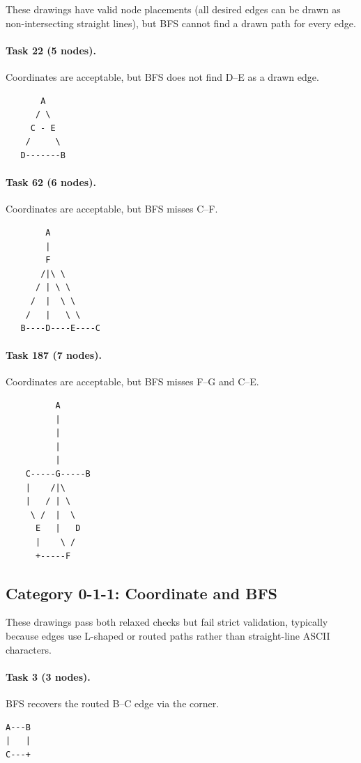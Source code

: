 \documentclass{article}
\begin{document}
These drawings have valid node placements (all desired edges can be drawn as non-intersecting straight lines), but BFS cannot find a drawn path for every edge.

\paragraph{Task 22 (5 nodes).} Coordinates are acceptable, but BFS does not find D--E as a drawn edge.

\begin{verbatim}
       A
      / \
     C - E
    /     \
   D-------B
\end{verbatim}

\paragraph{Task 62 (6 nodes).} Coordinates are acceptable, but BFS misses C--F.

\begin{verbatim}
        A
        |
        F
       /|\ \
      / | \ \
     /  |  \ \
    /   |   \ \
   B----D----E----C
\end{verbatim}

\paragraph{Task 187 (7 nodes).} Coordinates are acceptable, but BFS misses F--G and C--E.

\begin{verbatim}
          A
          |
          |
          |
          |
    C-----G-----B
    |    /|\
    |   / | \
     \ /  |  \
      E   |   D
      |    \ /
      +-----F
\end{verbatim}
\newpage
\subsection*{Category 0-1-1: Coordinate and BFS}

These drawings pass both relaxed checks but fail strict validation, typically because edges use L-shaped or routed paths rather than straight-line ASCII characters.

\paragraph{Task 3 (3 nodes).} BFS recovers the routed B--C edge via the corner.

\begin{verbatim}
A---B
|   |
C---+
\end{verbatim}
\end{document}
